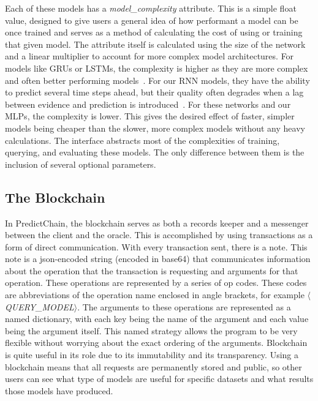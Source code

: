 \documentclass{ledger}
\begin{document}
Each of these models has a \textit{model\_complexity} attribute.  This is a simple float value, designed to give users
a general idea of how performant a model can be once trained and serves as a method of calculating the cost of using
or training that given model.  The attribute itself is calculated using the size of the network and a linear multiplier to
account for more complex model architectures.  For models like GRUs or LSTMs, the complexity is higher as they are more
complex and often better performing models~\cite{recurrentModeling}.  For our RNN models, they have the ability to
predict several time steps ahead, but their quality often degrades when a lag between evidence and prediction is
introduced~\cite{weightGuessing}.  For these networks and our MLPs, the complexity is lower. This gives the desired
effect of faster, simpler models being cheaper than the slower, more complex models without any heavy calculations.
The interface abstracts most of the complexities of training, querying, and evaluating these models. The only difference
between them is the inclusion of several optional parameters.

\subsection{The Blockchain}

In PredictChain, the blockchain serves as both a records keeper and a messenger between the client and the oracle.
This is accomplished by using transactions as a form of direct communication.  With every transaction sent, there is a note.
This note is a json-encoded string (encoded in base64) that communicates information about the operation that the transaction
is requesting and arguments for that operation.  These operations are represented by a series
of op codes.  These codes are abbreviations of the operation name enclosed in angle brackets, for example $\langle$\textit{QUERY\_MODEL}$\rangle$.
The arguments to these operations are represented as a named dictionary, with each key being the name of the argument and each
value being the argument itself.  This named strategy allows the program to be very flexible without worrying about the exact
ordering of the arguments.  Blockchain is quite useful in its role due to its immutability and its transparency.  Using
a blockchain means that all requests are permanently stored and public, so other users can see what type of models are useful
for specific datasets and what results those models have produced.
\end{document}

